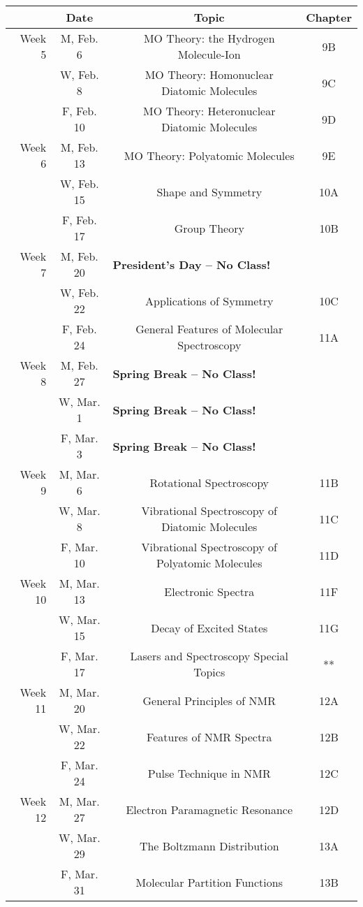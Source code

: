 \documentclass[12pt, letterpaper]{article}
\begin{document}
\begin{tabular}{rcccc}
& Date && Topic & Chapter\\
\midrule
Week 5 & M, Feb. 6&& MO Theory: the Hydrogen Molecule-Ion & 9B\\
& W, Feb. 8&& MO Theory: Homonuclear Diatomic Molecules & 9C\\
& F, Feb. 10&& MO Theory: Heteronuclear Diatomic Molecules & 9D\\
\midrule
Week 6 & M, Feb. 13&& MO Theory: Polyatomic Molecules & 9E\\
& W, Feb. 15&& Shape and Symmetry & 10A\\
& F, Feb. 17&& Group Theory & 10B\\
\midrule
Week 7 & M, Feb. 20& \multicolumn{3}{l}{\textbf{President's Day -- No Class!}}\\
& W, Feb. 22&& Applications of Symmetry & 10C\\
& F, Feb. 24&& General Features of Molecular Spectroscopy & 11A\\
\midrule
Week 8 & M, Feb. 27& \multicolumn{3}{l}{\textbf{Spring Break -- No Class!}}\\
& W, Mar. 1& \multicolumn{3}{l}{\textbf{Spring Break -- No Class!}}\\
& F, Mar. 3& \multicolumn{3}{l}{\textbf{Spring Break -- No Class!}}\\
\midrule
Week 9 & M, Mar. 6&& Rotational Spectroscopy & 11B\\
& W, Mar. 8&& Vibrational Spectroscopy of Diatomic Molecules & 11C\\
& F, Mar. 10&& Vibrational Spectroscopy of Polyatomic Molecules & 11D\\
\midrule
Week 10 & M, Mar. 13&& Electronic Spectra & 11F\\
& W, Mar. 15&& Decay of Excited States & 11G\\
& F, Mar. 17&& Lasers and Spectroscopy Special Topics & **\\
\midrule
Week 11 & M, Mar. 20&& General Principles of NMR & 12A\\
& W, Mar. 22&& Features of NMR Spectra & 12B\\
& F, Mar. 24&& Pulse Technique in NMR & 12C\\
\midrule
Week 12 & M, Mar. 27&& Electron Paramagnetic Resonance & 12D\\
& W, Mar. 29&& The Boltzmann Distribution & 13A\\
& F, Mar. 31&& Molecular Partition Functions & 13B\\
\end{tabular}
\end{document}
